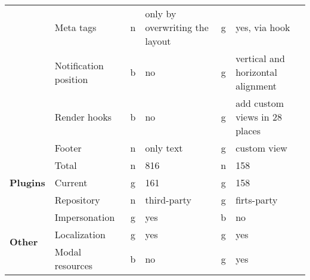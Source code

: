 \begin{table}[!ht]
{\begin{tabular}{llclcl}
            & Meta tags              & n  & only by overwriting the layout & g  & yes, via hook                           \\
            & Notification position  & b  & no                             & g  & vertical and horizontal alignment       \\
            & Render hooks           & b  & no                             & g  & add custom views in 28 places           \\
            & Footer                 & n  & only text                      & g  & custom view                             \\
            \hline
            \multirow{3}{*}{\textbf{Plugins}}        & Total                  & n  & 816                            & n  & 158                                     \\
            & Current                & g  & 161                            & g  & 158                                     \\
            & Repository             & n  & third-party                    & g  & firts-party                             \\
            \hline
            \multirow{3}{*}{\textbf{Other}}          & Impersonation          & g  & yes                            & b  & no                                      \\
            & Localization           & g  & yes                            & g  & yes                                     \\
            & Modal resources        & b  & no                             & g  & yes
        \end{tabular}%
    }
\end{table}
